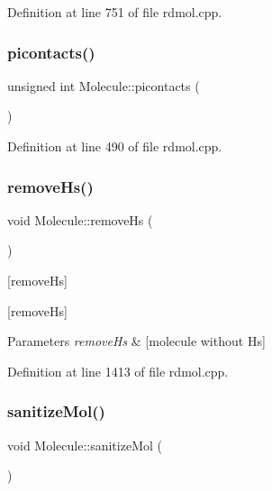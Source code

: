 Definition at line 751 of file rdmol.\+cpp.

\mbox{\label{class_molecule_a491c0807f620c690bb8b5eab3bf7efcf}} 
\subsubsection{\texorpdfstring{picontacts()}{picontacts()}}
{\footnotesize\ttfamily unsigned int Molecule\+::picontacts (\begin{DoxyParamCaption}{ }\end{DoxyParamCaption})}



Definition at line 490 of file rdmol.\+cpp.

\mbox{\label{class_molecule_aff4e7702feb85eb5d43b5ae89a504ca3}} 
\subsubsection{\texorpdfstring{remove\+Hs()}{removeHs()}}
{\footnotesize\ttfamily void Molecule\+::remove\+Hs (\begin{DoxyParamCaption}{ }\end{DoxyParamCaption})}



\mbox{[}remove\+Hs\mbox{]} 

\mbox{[}remove\+Hs\mbox{]}


\begin{DoxyParams}{Parameters}
{\em remove\+Hs} & \mbox{[}molecule without Hs\mbox{]} \\
\hline
\end{DoxyParams}


Definition at line 1413 of file rdmol.\+cpp.

\mbox{\label{class_molecule_a1d3b07d426af616e861606727848d35e}} 
\subsubsection{\texorpdfstring{sanitize\+Mol()}{sanitizeMol()}}
{\footnotesize\ttfamily void Molecule\+::sanitize\+Mol (\begin{DoxyParamCaption}{ }\end{DoxyParamCaption})}




